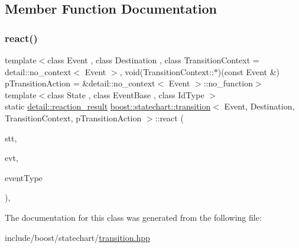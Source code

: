 \subsection{Member Function Documentation}
\mbox{\label{classboost_1_1statechart_1_1transition_a8b4d12e80f8dc176fe4bc2465b4ba9fd}} 
\subsubsection{\texorpdfstring{react()}{react()}}
{\footnotesize\ttfamily template$<$class Event , class Destination , class Transition\+Context  = detail\+::no\+\_\+context$<$ Event $>$, void(\+Transition\+Context\+::$\ast$)(const Event \&) p\+Transition\+Action = \&detail\+::no\+\_\+context$<$ Event $>$\+::no\+\_\+function$>$ \\
template$<$class State , class Event\+Base , class Id\+Type $>$ \\
static \mbox{\hyperlink{namespaceboost_1_1statechart_1_1detail_ab091bbb4c29327fb46ee479ea1b7255b}{detail\+::reaction\+\_\+result}} \mbox{\hyperlink{classboost_1_1statechart_1_1transition}{boost\+::statechart\+::transition}}$<$ Event, Destination, Transition\+Context, p\+Transition\+Action $>$\+::react (\begin{DoxyParamCaption}\item[{State \&}]{stt,  }\item[{const Event\+Base \&}]{evt,  }\item[{const Id\+Type \&}]{event\+Type }\end{DoxyParamCaption})\hspace{0.3cm}{\ttfamily [inline]}, {\ttfamily [static]}}



The documentation for this class was generated from the following file\+:\begin{DoxyCompactItemize}
\item 
include/boost/statechart/\mbox{\hyperlink{transition_8hpp}{transition.\+hpp}}\end{DoxyCompactItemize}
